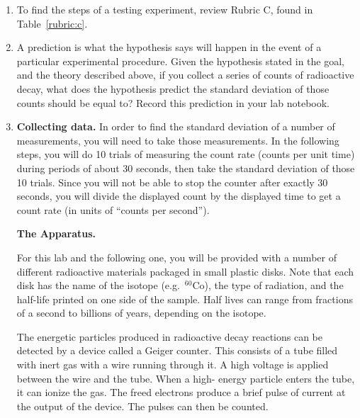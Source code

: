\begin{enumerate}
	\item To find the steps of a testing experiment, review Rubric C, found in Table~\ref{rubric:c}.
	
	\item\label{rad1:step:predict-random} A prediction is what the hypothesis says will happen in the event of a particular experimental procedure. Given the hypothesis stated in the goal, and the theory described above, if you collect a series of counts of radioactive decay, what does the hypothesis predict the standard deviation of those counts should be equal to? Record this prediction in your lab notebook.
	
	\item \textbf{Collecting data.} In order to find the standard deviation of a number of measurements, you will need to take those measurements. In the following steps, you will do 10 trials of measuring the count rate (counts per unit time) during periods of about 30 seconds, then take the standard deviation of those 10 trials. Since you will not be able to stop the counter after exactly 30 seconds, you will divide the displayed count by the displayed time to get a count rate (in units of ``counts per second'').
	
	\begin{framed}
		\textbf{The Apparatus.}
		
		For this lab and the following one, you will be provided with a number of different radioactive materials packaged in small plastic disks. Note that each disk has the name of
		the isotope (e.g.\ $^{60}$Co), the type of radiation, and the half-life printed on one side of the
		sample. Half lives can range from fractions of a second to billions of years, depending on
		the isotope.
		
		The energetic particles produced in radioactive decay reactions can be detected by a
		device called a Geiger counter. This consists of a tube filled with inert gas with a wire
		running through it. A high voltage is applied between the wire and the tube. When a high-
		energy particle enters the tube, it can ionize the gas. The freed electrons produce a brief
		pulse of current at the output of the device. The pulses can then be counted.
		

\end{framed}
\end{enumerate}
